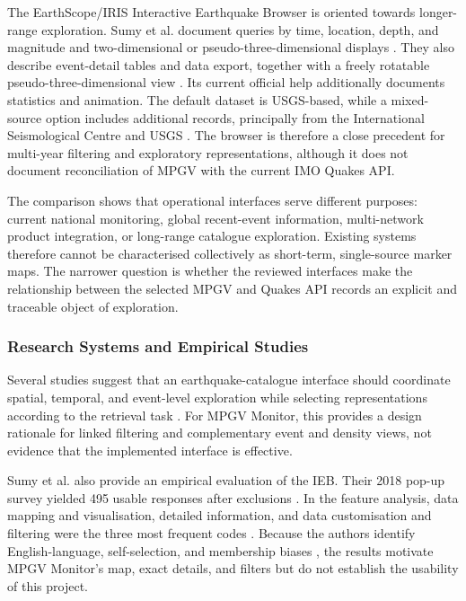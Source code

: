 \documentclass[12pt]{article}
\begin{document}
The EarthScope/IRIS Interactive Earthquake Browser is oriented towards longer-range exploration. Sumy et al. document queries by time, location, depth, and magnitude and two-dimensional or pseudo-three-dimensional displays \cite[pp.~2922--2924]{Sumy2020}. They also describe event-detail tables and data export, together with a freely rotatable pseudo-three-dimensional view \cite[pp.~2924--2925]{Sumy2020}. Its current official help additionally documents statistics and animation. The default dataset is USGS-based, while a mixed-source option includes additional records, principally from the International Seismological Centre and USGS \cite{iris_ieb_help}. The browser is therefore a close precedent for multi-year filtering and exploratory representations, although it does not document reconciliation of MPGV with the current IMO Quakes API.

The comparison shows that operational interfaces serve different purposes: current national monitoring, global recent-event information, multi-network product integration, or long-range catalogue exploration. Existing systems therefore cannot be characterised collectively as short-term, single-source marker maps. The narrower question is whether the reviewed interfaces make the relationship between the selected MPGV and Quakes API records an explicit and traceable object of exploration.

\subsubsection{Research Systems and Empirical Studies}

Several studies suggest that an earthquake-catalogue interface should coordinate spatial, temporal, and event-level exploration while selecting representations according to the retrieval task \cite[pp.~1413--1415]{Yuan2010}\cite[pp.~156, 160--161]{PodorKiszely2014}. For MPGV Monitor, this provides a design rationale for linked filtering and complementary event and density views, not evidence that the implemented interface is effective.

Sumy et al. also provide an empirical evaluation of the IEB. Their 2018 pop-up survey yielded 495 usable responses after exclusions \cite[pp.~2925--2926]{Sumy2020}. In the feature analysis, data mapping and visualisation, detailed information, and data customisation and filtering were the three most frequent codes \cite[pp.~2929--2931]{Sumy2020}. Because the authors identify English-language, self-selection, and membership biases \cite[p.~2932]{Sumy2020}, the results motivate MPGV Monitor's map, exact details, and filters but do not establish the usability of this project.
\end{document}
